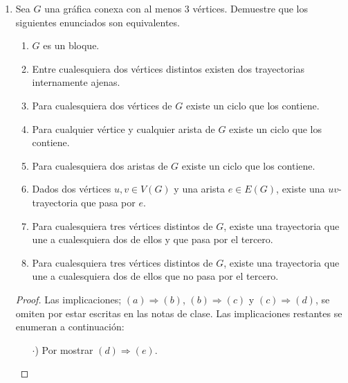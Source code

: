 \documentclass{article}
\begin{document}
\begin{enumerate}
\begin{proof}
                b) se cumple ya que $a_{n-r}$ y $b_{k-t}$ pertenencen a Y por construccion de P y Q.

                c) se cumple de nuevo por construccion de P y Q y ya que X y Y son conjuntos disjuntos de V
            \end{proof}

        \item Sea $G$ una gr\'afica conexa con al menos 3 v\'ertices. Demuestre que
          los siguientes enunciados son equivalentes.
            \begin{enumerate}
                \item $G$ es un bloque.

                \item Entre cualesquiera dos v\'ertices distintos existen dos trayectorias internamente ajenas.

                \item Para cualesquiera dos v\'ertices de $G$ existe un ciclo que los
                contiene.

                \item Para cualquier v\'ertice y cualquier arista de $G$ existe un ciclo
                que los contiene.

                \item Para cualesquiera dos aristas de $G$ existe un ciclo que los
                contiene.

                \item Dados dos v\'ertices $u,v \in V(G)$ y una arista $e \in E(G)$,
                existe una $uv$-trayectoria que pasa por $e$.

                \item Para cualesquiera tres v\'ertices distintos de $G$, existe una
                trayectoria que une a cualesquiera dos de ellos y que pasa por el
                tercero.

                \item Para cualesquiera tres v\'ertices distintos de $G$, existe una
                trayectoria que une a cualesquiera dos de ellos que no pasa por el
                tercero.
            \end{enumerate}

            \renewcommand\qedsymbol{QED}
            \begin{proof}
                Las implicaciones; $(a) \Rightarrow (b)$, $(b) \Rightarrow (c)$
                y $(c) \Rightarrow (d)$, se omiten por estar escritas en las
                notas de clase. Las implicaciones restantes se enumeran a
                continuación:
                \begin{itemize}
                    \item[$\cdot$)] Por mostrar $(d) \Rightarrow (e)$.


\end{itemize}
\end{proof}
\end{enumerate}
\end{document}
